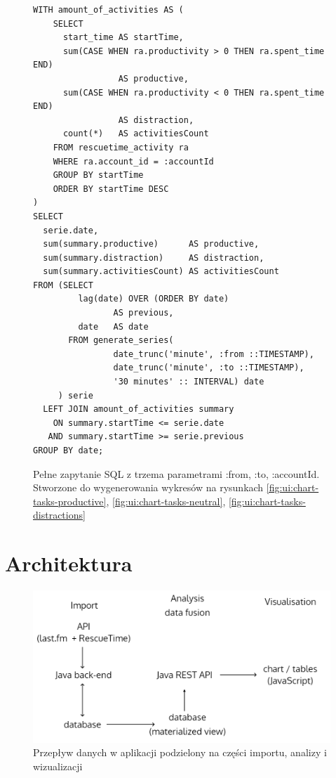 \documentclass[openright]{xmgr}
\begin{document}
\begin{figure}

\begin{verbatim}
WITH amount_of_activities AS (
    SELECT
      start_time AS startTime,
      sum(CASE WHEN ra.productivity > 0 THEN ra.spent_time END)
                 AS productive,
      sum(CASE WHEN ra.productivity < 0 THEN ra.spent_time END)
                 AS distraction,
      count(*)   AS activitiesCount
    FROM rescuetime_activity ra
    WHERE ra.account_id = :accountId
    GROUP BY startTime
    ORDER BY startTime DESC
)
SELECT
  serie.date,
  sum(summary.productive)      AS productive,
  sum(summary.distraction)     AS distraction,
  sum(summary.activitiesCount) AS activitiesCount
FROM (SELECT
         lag(date) OVER (ORDER BY date)
                AS previous,
         date   AS date
       FROM generate_series(
                date_trunc('minute', :from ::TIMESTAMP),
                date_trunc('minute', :to ::TIMESTAMP),
                '30 minutes' :: INTERVAL) date
     ) serie
  LEFT JOIN amount_of_activities summary
    ON summary.startTime <= serie.date
   AND summary.startTime >= serie.previous
GROUP BY date;
\end{verbatim}
\caption{Pełne zapytanie SQL z trzema parametrami :from, :to, :accountId.
    Stworzone do wygenerowania wykresów na rysunkach \ref{fig:ui:chart-tasks-productive}, \ref{fig:ui:chart-tasks-neutral}, \ref{fig:ui:chart-tasks-distractions}}
\end{figure}

\chapter{Architektura}

    \begin{figure}
        \includegraphics[width=\linewidth]{fig/data-flow.png}
        \caption{Przepływ danych w aplikacji podzielony na części importu, analizy i wizualizacji}
        \label{fig:data-flow}
    \end{figure}
\end{document}
